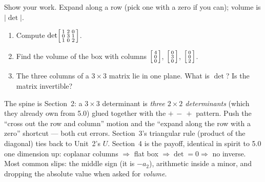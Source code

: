 \documentclass[10pt]{article}
\begin{document}
\begin{practicebox}
Show your work. Expand along a row (pick one with a zero if you can); volume is $|\det|$.
\begin{enumerate}[leftmargin=1.6em, itemsep=6pt]
  \item Compute $\det\begin{bsmallmatrix} 1 & 2 & 0 \\ 0 & 3 & 1 \\ 1 & 0 & 2 \end{bsmallmatrix}$. 
  \item Find the volume of the box with columns $\begin{bsmallmatrix} 4\\0\\0 \end{bsmallmatrix}$, $\begin{bsmallmatrix} 0\\3\\0 \end{bsmallmatrix}$, $\begin{bsmallmatrix} 0\\0\\2 \end{bsmallmatrix}$. 
  \item The three columns of a $3\times3$ matrix lie in one plane. What is $\det$? Is the matrix invertible? 
\end{enumerate}
\end{practicebox}

\begin{teachernote}
The spine is Section~2: a $3\times3$ determinant is \emph{three $2\times2$ determinants} (which they
already own from 5.0) glued together with the $+\,-\,+$ pattern. Push the ``cross out the row and
column'' motion and the ``expand along the row with a zero'' shortcut --- both cut errors. Section~3's
triangular rule (product of the diagonal) ties back to Unit~2's $U$. Section~4 is the payoff, identical
in spirit to 5.0 one dimension up: coplanar columns $\Rightarrow$ flat box $\Rightarrow\det=0\Rightarrow$
no inverse. Most common slips: the middle sign (it is $\mathbf{-}a_2$), arithmetic inside a minor, and
dropping the absolute value when asked for \emph{volume}.
\end{teachernote}
\end{document}
